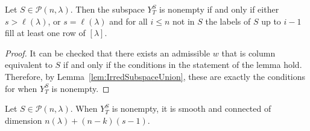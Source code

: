 \documentclass[12pt]{amsart}
\newcommand{\la}{\lambda}
\begin{document}
\begin{lemma}
    \begin{lemma}\label{lem:IrreducibleNonempty}
      Let $S\in \mathcal{P}(n,\la)$. Then the subspace $Y_T^S$ is nonempty if and only if either $s>\ell(\la)$, or $s=\ell(\la)$ and for all $i\leq n$ not in $S$ the labels of $S$ up to $i-1$ fill at least one row of $[\la]$.
    \end{lemma}

    \begin{proof}
            It can be checked that there exists an admissible $w$ that is column equivalent to $S$ if and only if the conditions in the statement of the lemma hold. Therefore, by Lemma~\ref{lem:IrredSubspaceUnion}, these are exactly the conditions for when $Y_T^S$ is nonempty.
    \end{proof}

    \begin{lemma}\label{lem:IrreducibleDimension}
      Let $S\in \mathcal{P}(n,\la)$. When $Y_T^S$ is nonempty, it is smooth and connected of dimension $n(\la) + (n-k)(s-1)$.
    \end{lemma}


\end{lemma}
\end{document}
